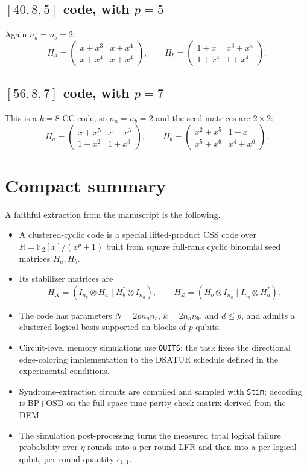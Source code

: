 \documentclass[11pt]{article}
\begin{document}
\subsection{$[40,8,5]$ code, with $p=5$}
Again $n_a=n_b=2$:
\[
H_a=
\begin{pmatrix}
x+x^3 & x+x^4 \\
x+x^4 & x+x^4
\end{pmatrix},
\qquad
H_b=
\begin{pmatrix}
1+x   & x^3+x^4 \\
1+x^4 & 1+x^4
\end{pmatrix}.
\]

\subsection{$[56,8,7]$ code, with $p=7$}
This is a $k=8$ CC code, so $n_a=n_b=2$ and the seed matrices are $2\times2$:
\[
H_a=
\begin{pmatrix}
x+x^5 & x+x^3 \\
1+x^2 & 1+x^3
\end{pmatrix},
\qquad
H_b=
\begin{pmatrix}
x^2+x^5 & 1+x \\
x^5+x^6 & x^4+x^6
\end{pmatrix}.
\]

\section{Compact summary}
A faithful extraction from the manuscript is the following.

\begin{itemize}
    \item A clustered-cyclic code is a special lifted-product CSS code over $R=\mathbb{F}_2[x]/(x^p+1)$ built from square full-rank cyclic binomial seed matrices $H_a,H_b$.
    \item Its stabilizer matrices are
    \[
    H_X = (I_{n_b}\otimes H_a\mid H_b^*\otimes I_{n_a}),
    \qquad
    H_Z = (H_b\otimes I_{n_a}\mid I_{n_b}\otimes H_a^*).
    \]
    \item The code has parameters $N=2pn_an_b$, $k=2n_an_b$, and $d\le p$, and admits a clustered logical basis supported on blocks of $p$ qubits.
    \item Circuit-level memory simulations use \texttt{QUITS}; the task fixes the directional edge-coloring implementation to the DSATUR schedule defined in the experimental conditions.
    \item Syndrome-extraction circuits are compiled and sampled with \texttt{Stim}; decoding is BP+OSD on the full space-time parity-check matrix derived from the DEM.
    \item The simulation post-processing turns the measured total logical failure probability over $\eta$ rounds into a per-round LFR and then into a per-logical-qubit, per-round quantity $\epsilon_{1,1}$.
\end{itemize}
\end{document}
